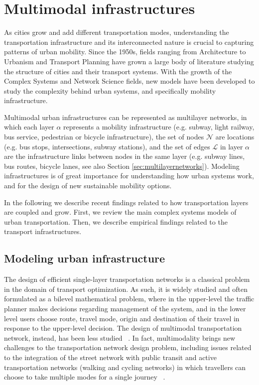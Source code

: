 \section{Multimodal infrastructures}\label{sec:multimodalinfrastructures}

As cities grow and add different transportation modes, understanding the transportation infrastructure and its interconnected nature is crucial to capturing patterns of urban mobility. Since the 1950s, fields ranging from Architecture to Urbanism and Transport Planning have grown a large body of literature studying the structure of cities and their transport systems. With the growth of the Complex Systems and Network Science fields, new models have been developed to study the complexity behind urban systems, and specifically mobility infrastructure.

Multimodal urban infrastructures can be represented as multilayer networks, in which each layer $\alpha$ represents a mobility infrastructure (e.g. subway, light railway, bus service, pedestrian or bicycle infrastructure), the set of nodes $\mathcal{N}$ are locations (e.g. bus stops, intersections, subway stations), and the set of edges $\mathcal{L}$ in layer $\alpha$ are the infrastructure links between nodes in the same layer (e.g. subway lines, bus routes, bicycle lanes, see also Section \ref{sec:multilayernetworks}). Modeling infrastructures is of great importance for understanding how urban systems work, and for the design of new sustainable mobility options. 

In the following we describe recent findings related to how transportation layers are coupled and grow. First, we review the main complex systems models of urban transportation. Then, we describe empirical findings related to the transport infrastructures.

\subsection{Modeling urban infrastructure}\label{sec:modelinginsrastructure}

The design of efficient single-layer transportation networks is a classical problem in the domain of transport optimization. As such, it is widely studied and often formulated as a bilevel mathematical problem, where in the upper-level the traffic planner makes decisions regarding management of the system, and in the lower level users choose route, travel mode, origin and destination of their travel in response to the upper-level decision. The design of multimodal transportation network, instead, has been less studied ~\cite{farahani2013review}. In fact, multimodality brings new challenges to the transportation network design problem, including issues related to the integration of the street network with public transit and active transportation networks (walking and cycling networks) in which travellers can choose to take multiple modes for a single journey ~\cite{zhang2014design,huang2018multimodal}.

